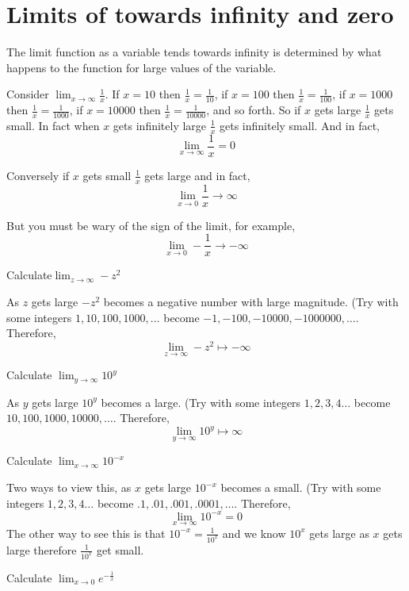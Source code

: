 \section*{Limits of towards infinity and zero}

The limit function as a variable tends towards infinity is determined by what happens to the function for large values of the variable.

Consider $\displaystyle{\lim_{x\to \infty} \frac{1}{x}}$. If $x=10$ then $\frac{1}{x}=\frac{1}{10}$, if $x=100$ then $\frac{1}{x}=\frac{1}{100}$, if $x=1000$ then $\frac{1}{x}=\frac{1}{1000}$, if $x=10000$ then $\frac{1}{x}=\frac{1}{10000}$, and so forth. So if $x$ gets large $\frac{1}{x}$ gets small. In fact when $x$ gets infinitely large $\frac{1}{x}$ gets infinitely small. And in fact, $$\lim_{x\to\infty} \frac{1}{x}=0$$

Conversely if $x$ gets small $\frac{1}{x}$ gets large and in fact,
$$\lim_{x\to 0} \frac{1}{x}\to\infty$$

But you must be wary of the sign of the limit, for example,
$$\lim_{x\to 0} -\frac{1}{x}\to-\infty$$

\begin{questions}
\question Calculate$\displaystyle{\lim_{z\to \infty} -z^2}$
\begin{solution}[1.5in]
  As $z$ gets large $-z^2$ becomes a negative number with large magnitude. (Try with some integers $1,10, 100, 1000,\ldots$ become $-1, -100, -10000, -1000000,\ldots$. Therefore,
  $$\lim_{z\to \infty} -z^2 \mapsto -\infty$$
\end{solution}
\question
Calculate $\displaystyle{\lim_{y\to \infty} 10^y}$
\begin{solution}[1.5in]
  As $y$ gets large $10^y$ becomes a large. (Try with some integers $1, 2, 3, 4\ldots$ become $10, 100, 1000, 10000,\ldots$. Therefore,
$$\lim_{y\to \infty} 10^y\mapsto \infty$$
\end{solution}
\question
Calculate $\displaystyle{\lim_{x\to \infty} 10^{-x}}$
\begin{solution}[1.5in]
  Two ways to view this, as $x$ gets large $10^{-x}$ becomes a small. (Try with some integers $1, 2, 3, 4\ldots$ become $.1, .01, .001, .0001,\ldots$. Therefore,
  $$\lim_{x\to \infty} 10^{-x}=0$$
  The other way to see this is that $\displaystyle{10^{-x}=\frac{1}{10^x}}$ and we know $10^x$ gets large as $x$ gets large therefore $\frac{1}{10^x}$ get small.
\end{solution}
Calculate $\displaystyle{\lim_{x\to 0} e^{-{\frac{1}{x}}}}$
\end{questions}
